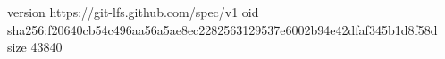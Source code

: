 version https://git-lfs.github.com/spec/v1
oid sha256:f20640cb54c496aa56a5ae8ec2282563129537e6002b94e42dfaf345b1d8f58d
size 43840
